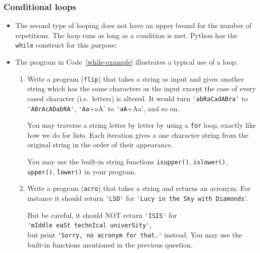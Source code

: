 \documentclass[a4paper]{article}
\begin{document}
\subsubsection{Conditional loops}

\begin{itemize}

\item The second type of looping does not have an upper bound for the number of
repetitions. The loop runs as long as a condition is met. Python has the
\Verb+while+ construct for this purpose:

\item The program in Code~\ref{while-example} illustrates a typical use of a
 loop. 


\begin{uexercise}\label{excontainers}
\begin{enumerate}
\item Write a program (\Verb+flip+) that takes a string as input and gives
another string which has the same characters as the input except 
the case of every cased character (i.e.\ letters) is altered. 
It would turn 
\Verb+'abRaCadABra'+
 to
\Verb+'ABrAcADabRA'+,   
\Verb+'Aa++aA' to \Verb+'aA++Aa', and so on.

You may traverse a string letter by letter by using a \Verb+for+ loop, exactly
like how we do for lists. Each iteration gives a one character string from the
original string in the order of their appearance.

You may use the built-in string functions \Verb+isupper()+, \Verb+islower()+,
\Verb+upper()+, \Verb+lower()+ in your program. 

\item
Write a program (\Verb+acro+) that takes a string and returns an acronym.
For instance it should return \Verb+'LSD'+ for 
\Verb+'Lucy in the Sky with Diamonds+'. 

But be careful, it should NOT return \Verb+'ISIS'+ for \\ \Verb+'mIddle eaSt technIcal univerSity'+, \\ but print \Verb+'Sorry, no acronym for that.'+
instead. You may use the built-in functions mentioned in the previous question.


\end{enumerate}
\end{uexercise}
\end{itemize}
\end{document}
